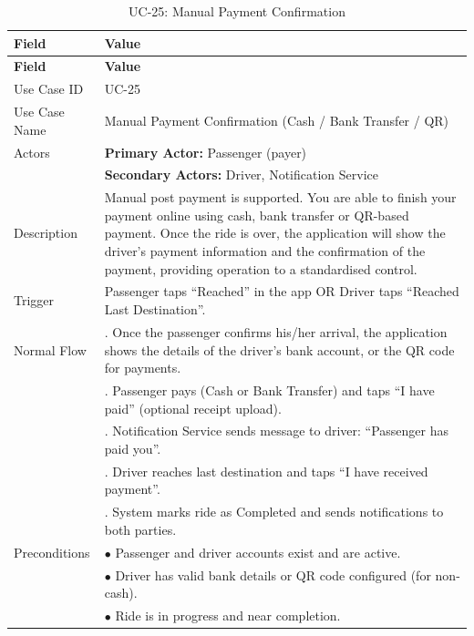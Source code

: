 \begin{longtable}{|>{\raggedright\arraybackslash}p{4cm}|>{\raggedright\arraybackslash}p{11cm}|}
\caption{UC-25: Manual Payment Confirmation}
\label{tab:uc-25} \\
\hline
\rowcolor{lightgray!30}
\textbf{Field} & \textbf{Value} \\
\hline
\endfirsthead
\hline
\rowcolor{lightgray!30}
\textbf{Field} & \textbf{Value} \\
\hline
\endhead
\hline
\endfoot
\hline
\endlastfoot
Use Case ID & UC-25 \\
\hline
Use Case Name & Manual Payment Confirmation (Cash / Bank Transfer / QR) \\
\hline
Actors & \textbf{Primary Actor:} Passenger (payer) \\
& \textbf{Secondary Actors:} Driver, Notification Service \\
\hline
Description & Manual post payment is supported. You are able to finish your payment online using cash, bank transfer or QR-based payment. Once the ride is over, the application will show the driver's payment information and the confirmation of the payment, providing operation to a standardised control. \\
\hline
Trigger & Passenger taps ``Reached'' in the app OR Driver taps ``Reached Last Destination''. \\
\hline
Normal Flow & 1. Once the passenger confirms his/her arrival, the application shows the details of the driver's bank account, or the QR code for payments. \\
& 2. Passenger pays (Cash or Bank Transfer) and taps ``I have paid'' (optional receipt upload). \\
& 3. Notification Service sends message to driver: ``Passenger has paid you''. \\
& 4. Driver reaches last destination and taps ``I have received payment''. \\
& 5. System marks ride as Completed and sends notifications to both parties. \\
\hline
Preconditions & $\bullet$ Passenger and driver accounts exist and are active. \\
& $\bullet$ Driver has valid bank details or QR code configured (for non-cash). \\
& $\bullet$ Ride is in progress and near completion. \\

\end{longtable}
